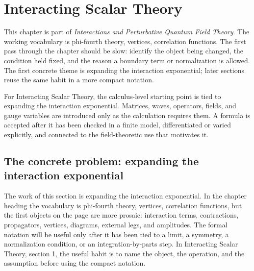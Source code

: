\chapter{Interacting Scalar Theory}


This chapter is part of \emph{Interactions and Perturbative Quantum Field Theory}.  The working vocabulary is phi-fourth theory, vertices, correlation functions.  The first pass through the chapter should be slow: identify the object being changed, the condition held fixed, and the reason a boundary term or normalization is allowed.  The first concrete theme is expanding the interaction exponential; later sections reuse the same habit in a more compact notation.

For Interacting Scalar Theory, the calculus-level starting point is tied to expanding the interaction exponential.  Matrices, waves, operators, fields, and gauge variables are introduced only as the calculation requires them.  A formula is accepted after it has been checked in a finite model, differentiated or varied explicitly, and connected to the field-theoretic use that motivates it.

\section{The concrete problem: expanding the interaction exponential}













The work of this section is expanding the interaction exponential.  In the chapter heading the vocabulary is phi-fourth theory, vertices, correlation functions, but the first objects on the page are more prosaic: interaction terms, contractions, propagators, vertices, diagrams, external legs, and amplitudes.  The formal notation will be useful only after it has been tied to a limit, a symmetry, a normalization condition, or an integration-by-parts step.  In Interacting Scalar Theory, section 1, the useful habit is to name the object, the operation, and the assumption before using the compact notation.

